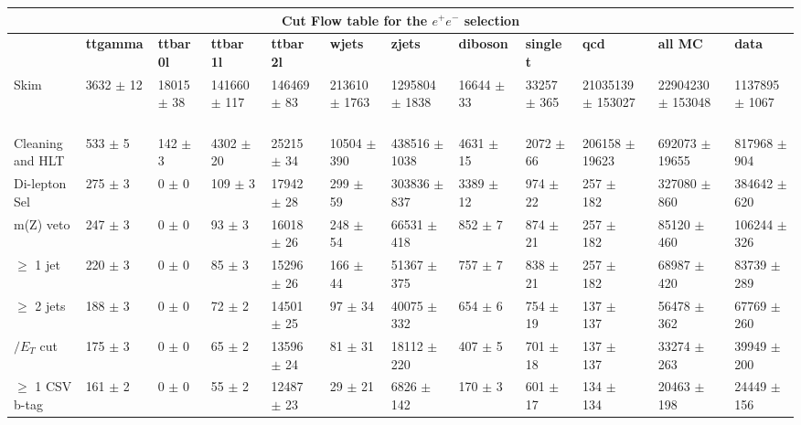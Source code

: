 \begin{table}
  \centering
\resizebox{\columnwidth}{!} {

\begin{tabular}{|l|l|l|l|l|l|l|l|l|l|l|l|}
\hline
\multicolumn{12}{|c|}{\textbf{Cut Flow table for the $e^+e^-$ selection}} \\
\hline
& \textbf{ttgamma} & \textbf{ttbar 0l} & \textbf{ttbar 1l} & \textbf{ttbar 2l} & \textbf{wjets} & \textbf{zjets} & \textbf{diboson} & \textbf{single t} & \textbf{qcd} & \textbf{all MC} & \textbf{data} \\
\hline
Skim & 3632 $\pm$ 12 \ & 18015 $\pm$ 38 \ & 141660 $\pm$ 117 \ & 146469 $\pm$ 83 \ & 213610 $\pm$ 1763 \ & 1295804 $\pm$ 1838 \ & 16644 $\pm$ 33 \ & 33257 $\pm$ 365 \ & 21035139 $\pm$ 153027\ & 22904230 $\pm$ 153048 \ & 1137895 $\pm$ 1067 \\
Cleaning and HLT & 533 $\pm$ 5 \ & 142 $\pm$ 3 \ & 4302 $\pm$ 20 \ & 25215 $\pm$ 34 \ & 10504 $\pm$ 390 \ & 438516 $\pm$ 1038 \ & 4631 $\pm$ 15 \ & 2072 $\pm$ 66 \ & 206158 $\pm$ 19623\ & 692073 $\pm$ 19655 \ & 817968 $\pm$ 904 \\
Di-lepton Sel & 275 $\pm$ 3 \ & 0 $\pm$ 0 \ & 109 $\pm$ 3 \ & 17942 $\pm$ 28 \ & 299 $\pm$ 59 \ & 303836 $\pm$ 837 \ & 3389 $\pm$ 12 \ & 974 $\pm$ 22 \ & 257 $\pm$ 182\ & 327080 $\pm$ 860 \ & 384642 $\pm$ 620 \\
m(Z) veto & 247 $\pm$ 3 \ & 0 $\pm$ 0 \ & 93 $\pm$ 3 \ & 16018 $\pm$ 26 \ & 248 $\pm$ 54 \ & 66531 $\pm$ 418 \ & 852 $\pm$ 7 \ & 874 $\pm$ 21 \ & 257 $\pm$ 182\ & 85120 $\pm$ 460 \ & 106244 $\pm$ 326 \\
$\geq$ 1 jet & 220 $\pm$ 3 \ & 0 $\pm$ 0 \ & 85 $\pm$ 3 \ & 15296 $\pm$ 26 \ & 166 $\pm$ 44 \ & 51367 $\pm$ 375 \ & 757 $\pm$ 7 \ & 838 $\pm$ 21 \ & 257 $\pm$ 182\ & 68987 $\pm$ 420 \ & 83739 $\pm$ 289 \\
$\geq$ 2 jets & 188 $\pm$ 3 \ & 0 $\pm$ 0 \ & 72 $\pm$ 2 \ & 14501 $\pm$ 25 \ & 97 $\pm$ 34 \ & 40075 $\pm$ 332 \ & 654 $\pm$ 6 \ & 754 $\pm$ 19 \ & 137 $\pm$ 137\ & 56478 $\pm$ 362 \ & 67769 $\pm$ 260 \\
$\slash{E_{T}}$ cut & 175 $\pm$ 3 \ & 0 $\pm$ 0 \ & 65 $\pm$ 2 \ & 13596 $\pm$ 24 \ & 81 $\pm$ 31 \ & 18112 $\pm$ 220 \ & 407 $\pm$ 5 \ & 701 $\pm$ 18 \ & 137 $\pm$ 137\ & 33274 $\pm$ 263 \ & 39949 $\pm$ 200 \\
$\geq$ 1 CSV b-tag & 161 $\pm$ 2 \ & 0 $\pm$ 0 \ & 55 $\pm$ 2 \ & 12487 $\pm$ 23 \ & 29 $\pm$ 21 \ & 6826 $\pm$ 142 \ & 170 $\pm$ 3 \ & 601 $\pm$ 17 \ & 134 $\pm$ 134\ & 20463 $\pm$ 198 \ & 24449 $\pm$ 156 \\

\end{tabular}}
\end{table}
